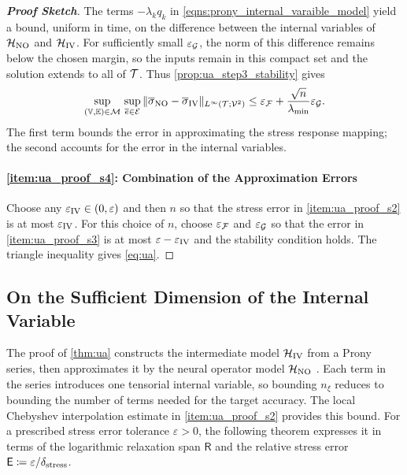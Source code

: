 \documentclass[3p, 12pt, preprint]{elsarticle}
\begin{document}
\begin{proof}[\bf Proof Sketch]
{\color{blue}The terms $-\lambda_kq_k$ in \cref{eqns:prony_internal_varaible_model} yield a bound, uniform in time, on the difference between the internal variables of ${\mathcal{H}}_{\rm NO}$ and ${\mathcal{H}}_{\rm IV}$. For sufficiently small $\varepsilon_{{\mathcal{G}}}$, the norm of this difference remains below the chosen margin, so the inputs remain in this compact set and the solution extends to all of ${\mathcal{T}}$. Thus \cref{prop:ua_step3_stability} gives
\begin{equation*}
    \sup_{(\mathbb{V},\mathbb{E})\in{\mathcal{M}}}\,\sup_{\overline e\in{\mathcal{E}}}
    \|\overline\sigma_{\rm NO}-\overline\sigma_{\rm IV}\|_{L^\infty({\mathcal{T}};{\mathcal{V}}^2)}
    \le\varepsilon_{{\mathcal{F}}}+\frac{\sqrt n}{\lambda_{\min}}\varepsilon_{{\mathcal{G}}}.
\end{equation*}
}
The first term bounds the error in approximating the stress response mapping; the second accounts for the error in the internal variables.

\paragraph{\ref{item:ua_proof_s4}: Combination of the Approximation Errors}
Choose any $\varepsilon_{\rm IV}\in(0,\varepsilon)$ and then $n$ so that the stress error in \ref{item:ua_proof_s2} is at most $\varepsilon_{\rm IV}$. For this choice of $n$, choose $\varepsilon_{{\mathcal{F}}}$ and $\varepsilon_{{\mathcal{G}}}$ so that the error in \ref{item:ua_proof_s3} is at most $\varepsilon-\varepsilon_{\rm IV}$ and the stability condition holds. The triangle inequality gives \cref{eq:ua}.
\end{proof}


\subsection{On the Sufficient Dimension of the Internal Variable}\label{subsec:ua_internal_variable_dimension}

{\color{blue}The proof of \cref{thm:ua} constructs the intermediate model ${\mathcal{H}}_{\rm IV}$ from a Prony series, then approximates it by the neural operator model ${\mathcal{H}}_{\rm NO}$ . Each term in the series introduces one tensorial internal variable, so bounding $n_\xi$ reduces to bounding the number of terms needed for the target accuracy. The local Chebyshev interpolation estimate in \ref{item:ua_proof_s2} provides this bound. For a prescribed stress error tolerance $\varepsilon>0$, the following theorem expresses it in terms of the logarithmic relaxation span $\mathsf R$ and the relative stress error $\mathsf E\coloneqq\varepsilon/\delta_{\rm stress}$.}
\end{document}
